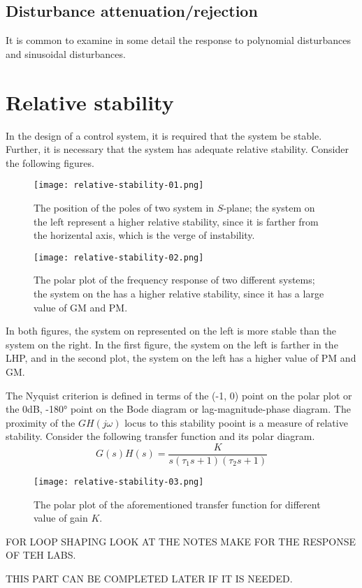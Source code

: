 \subsection{Disturbance attenuation/rejection}
It is common to examine in some detail the response to polynomial disturbances and sinusoidal disturbances.

\section{Relative stability}
In the design of a control system, it is required that the system be stable. Further, it is necessary that the system has adequate relative stability. Consider the following figures.
\begin{figure}[H]
    \centering
    \texttt{[image: relative-stability-01.png]}
    \caption{The position of the poles of two system in \(S\)-plane; the system on the left represent a higher relative stability, since it is farther from the horizental axis, which is the verge of instability.}
    \label{fig:relative-stability-01}
\end{figure}

\begin{figure}[H]
    \centering
    \texttt{[image: relative-stability-02.png]}
    \caption{The polar plot of the frequency response of two different systems; the system on the has a higher relative stability, since it has a large value of GM and PM.}
    \label{fig:relative-stability-02}
\end{figure}

In both figures, the system on represented on the
left is more stable than the system on the right. In the first figure, the system on the left is farther in the LHP, and in the second plot, the system on the left has a higher value of PM and GM.

The Nyquist criterion is defined in terms of the (-1, 0) point on the polar plot or the 0dB, -180° point on the Bode diagram or lag-magnitude-phase diagram. The proximity  of the \(GH(j\omega)\) locus to this stability pooint is a measure of relative stability. Consider the following transfer function and its polar diagram.
\[
G(s)H(s) = \frac{K}{s(\tau_1s +1)(\tau_2s+1)}
\]

\begin{figure}[H]
    \centering
    \texttt{[image: relative-stability-03.png]}
    \caption{The polar plot of the aforementioned transfer function for different value of gain \(K\).}
    \label{fig:relative-stability-03}
\end{figure}

FOR LOOP SHAPING LOOK AT THE NOTES MAKE FOR THE RESPONSE OF TEH LABS.

THIS PART CAN BE COMPLETED LATER IF IT IS NEEDED.
